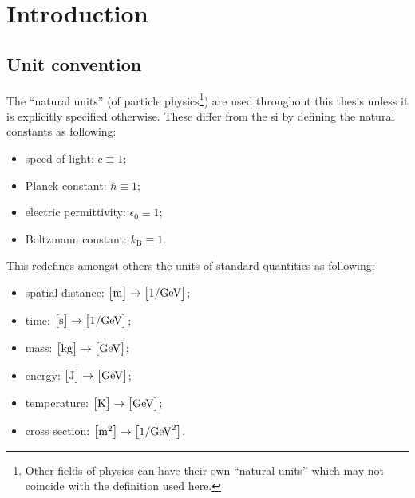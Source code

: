 \chapter{Introduction}

\section{Unit convention}

The ``natural units'' (of particle physics\footnote{Other fields of physics can have their own ``natural units'' which may not coincide with the definition used here.}) are used throughout this thesis unless it is explicitly specified otherwise. These differ from the \gls{si} by defining the natural constants as following:

\begin{itemize}
\item speed of light: $\mathrm{c}\equiv 1$;
\item Planck constant: $\hbar\equiv 1$;
\item electric permittivity: $\epsilon_{0}\equiv 1$;
\item Boltzmann constant: $k_\mathrm{B}\equiv 1$.
\end{itemize}

This redefines amongst others the units of standard quantities as following:

\begin{itemize}
\item spatial distance: $\big[\mathrm{m}\big]\rightarrow \big[1/\mathrm{GeV}\big]$;
\item time: $\big[\mathrm{s}\big]\rightarrow \big[1/\mathrm{GeV}\big]$;
\item mass: $\big[\mathrm{kg}\big]\rightarrow \big[\mathrm{GeV}\big]$;
\item energy: $\big[\mathrm{J}\big]\rightarrow \big[\mathrm{GeV}\big]$;
\item temperature: $\big[\mathrm{K}\big]\rightarrow \big[\mathrm{GeV}\big]$;
\item cross section: $\big[\mathrm{m}^{2}\big]\rightarrow \big[1/\mathrm{GeV}^{2}\big]$.
\end{itemize}

